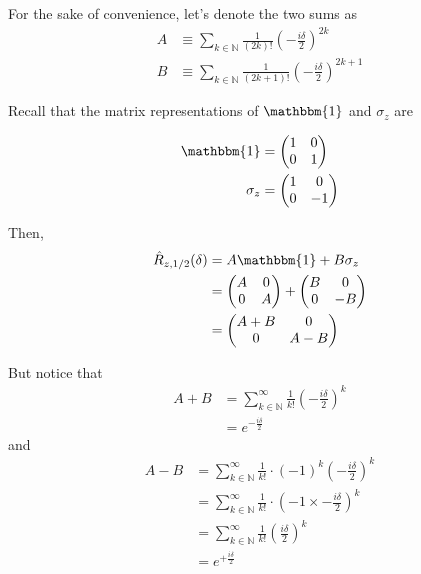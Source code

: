 \documentclass{article}
\begin{document}
\begin{enumerate}[label=(\alph*)]
  For the sake of convenience, let's denote the two sums as 
  \begin{align*}
    A &\equiv \sum_{k \in \mathbb{N}} \frac{1}{(2k)!} \left(-\frac{i\delta}{2}\right)^{2k}  \\
    B &\equiv  \sum_{k \in \mathbb{N}} \frac{1}{(2k+1)!} \left(-\frac{i\delta}{2}\right)^{2k+1}
  \end{align*}

  Recall that the matrix representations of $\mathbbm{1}$ and $\sigma_z$ are 

  \begin{align*}
    \mathbbm{1} &= \begin{pmatrix}
      1 & 0 \\
      0 & 1
    \end{pmatrix} \\
    \sigma_z &= \begin{pmatrix}
      1 & 0 \\
      0 & -1 
    \end{pmatrix}
  \end{align*}

  Then,
  \begin{align*}
    \hat{R}_{z, 1/2} (\delta) &= A \mathbbm{1} + B \sigma_z \\
    &= \begin{pmatrix}
      A & 0 \\
      0 & A
    \end{pmatrix} + 
    \begin{pmatrix}
      B & 0 \\
      0 & -B
    \end{pmatrix} \\
    &= \begin{pmatrix}
      A + B & 0 \\
      0 & A - B
    \end{pmatrix}
  \end{align*}

  But notice that 
  \begin{align*}
    A + B &= \sum_{k \in \mathbb{N}}^{\infty} \frac{1}{k!} \left( -\frac{i \delta}{2} \right)^k \\
    &= e^{-\frac{i \delta}{2}}
  \end{align*}
  and 
  \begin{align*}
    A - B &= \sum_{k \in \mathbb{N}}^{\infty} \frac{1}{k!} \cdot (-1)^{k} \left( -\frac{i \delta}{2} \right)^k \\
    &= \sum_{k \in \mathbb{N}}^{\infty} \frac{1}{k!} \cdot \left( -1 \times -\frac{i \delta}{2} \right)^k \\
    &= \sum_{k \in \mathbb{N}}^{\infty} \frac{1}{k!} \left( \frac{i \delta}{2} \right)^k \\
    &= e^{+\frac{i \delta}{2}}
  \end{align*}


\end{enumerate}
\end{document}
